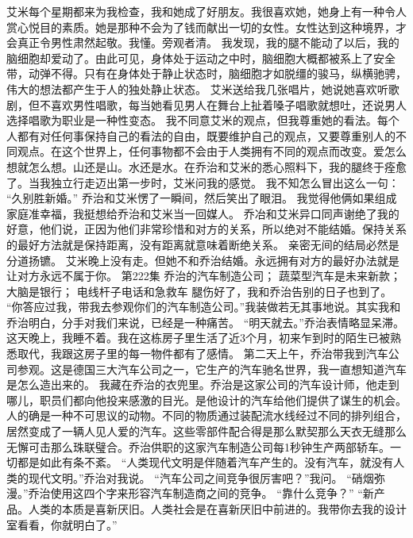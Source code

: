 \documentclass[a4paper,12pt,UTF8,twoside]{ctexbook}
\begin{document}
        艾米每个星期都来为我检查，我和她成了好朋友。我很喜欢她，她身上有一种令人赏心悦目的素质。她是那种不会为了钱而献出一切的女性。女性达到这种境界，才会真正令男性肃然起敬。我懂。旁观者清。 
        我发现，我的腿不能动了以后，我的脑细胞却爱动了。由此可见，身体处于运动之中时，脑细胞大概都被系上了安全带，动弹不得。只有在身体处于静止状态时，脑细胞才如脱缰的骏马，纵横驰骋，伟大的想法都产生于人的独处静止状态。 
        艾米送给我几张唱片，她说她喜欢听歌剧，但不喜欢男性唱歌，每当她看见男人在舞台上扯着嗓子唱歌就想吐，还说男人选择唱歌为职业是一种性变态。 
        我不同意艾米的观点，但我尊重她的看法。每个人都有对任何事保持自己的看法的自由，既要维护自己的观点，又要尊重别人的不同观点。在这个世界上，任何事物都不会由于人类拥有不同的观点而改变。爱怎么想就怎么想。山还是山。水还是水。在乔治和艾米的悉心照料下，我的腿终于痊愈了。当我独立行走迈出第一步时，艾米问我的感觉。 
        我不知怎么冒出这么一句： 
        “久别胜新婚。” 
        乔治和艾米愣了一瞬间，然后笑出了眼泪。 
        我觉得他俩如果组成家庭准幸福，我挺想给乔治和艾米当一回媒人。 
        乔冶和艾米异口同声谢绝了我的好意，他们说，正因为他们非常珍惜和对方的关系，所以绝对不能结婚。保持关系的最好方法就是保持距离，没有距离就意味着断绝关系。 
        亲密无间的结局必然是分道扬镳。 
        艾米晚上没有走。但她不和乔治结婚。永远拥有对方的最好办法就是让对方永远不属于你。   第222集 
        乔治的汽车制造公司； 
        蔬菜型汽车是未来新款； 
        大脑是银行； 
        电线杆子电话和急救车   
        腿伤好了，我和乔治告别的日子也到了。 
        “你答应过我，带我去参观你们的汽车制造公司。”我装做若无其事地说。其实我和乔治明白，分手对我们来说，已经是一种痛苦。 
        “明天就去。”乔治表情略显呆滞。 
        这天晚上，我睡不着。我在这栋房子里生活了近3个月，初来乍到时的陌生已被熟悉取代，我跟这房子里的每一物件都有了感情。 
        第二天上午，乔治带我到汽车公司参观。这是德国三大汽车公司之一，它生产的汽车驰名世界，我一直想知道汽车是怎么造出来的。 
        我藏在乔治的衣兜里。乔治是这家公司的汽车设计师，他走到哪儿，职员们都向他投来感激的目光。是他设计的汽车给他们提供了谋生的机会。 
        人的确是一种不可思议的动物。不同的物质通过装配流水线经过不同的排列组合，居然变成了一辆人见人爱的汽车。这些零部件配合得是那么默契那么天衣无缝那么无懈可击那么珠联璧合。乔治供职的这家汽车制造公司每1秒钟生产两部轿车。一切都是如此有条不紊。 
        “人类现代文明是伴随着汽车产生的。没有汽车，就没有人类的现代文明。”乔治对我说。 
        “汽车公司之间竞争很厉害吧？”我问。 
        “硝烟弥漫。”乔治使用这四个字来形容汽车制造商之间的竞争。 
        “靠什么竞争？” 
        “新产品。人类的本质是喜新厌旧。人类社会是在喜新厌旧中前进的。我带你去我的设计室看看，你就明白了。” 
\end{document}
